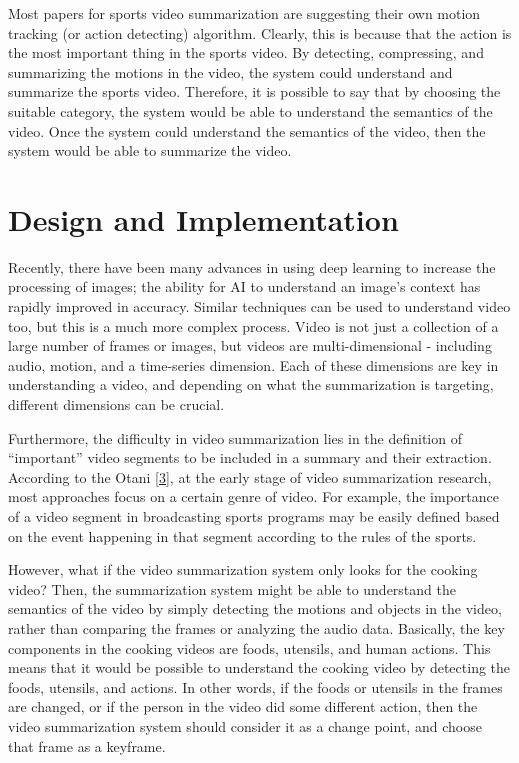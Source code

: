 \documentclass{article}
\begin{document}
Most papers for sports video summarization are suggesting their own motion tracking (or action detecting) algorithm. Clearly, this is because that the action is the most important thing in the sports video. By detecting, compressing, and summarizing the motions in the video, the system could understand and summarize the sports video. Therefore, it is possible to say that by choosing the suitable category, the system would be able to understand the semantics of the video. Once the system could understand the semantics of the video, then the system would be able to summarize the video.

\section{Design and Implementation}

Recently, there have been many advances in using deep learning to increase the processing of images; the ability for AI to understand an image’s context has rapidly improved in accuracy. Similar techniques can be used to understand video too, but this is a much more complex process. Video is not just a collection of a large number of frames or images, but videos are multi-dimensional - including audio, motion, and a time-series dimension. Each of these dimensions are key in understanding a video, and depending on what the summarization is targeting, different dimensions can be crucial.

Furthermore, the difficulty in video summarization lies in the definition of “important” video segments to be included in a summary and their extraction. According to the Otani \hyperlink{ref3}{[3]}, at the early stage of video summarization research, most approaches focus on a certain genre of video. For example, the importance of a video segment in broadcasting sports programs may be easily defined based on the event happening in that segment according to the rules of the sports.

However, what if the video summarization system only looks for the cooking video? Then, the summarization system might be able to understand the semantics of the video by simply detecting the motions and objects in the video, rather than comparing the frames or analyzing the audio data. Basically, the key components in the cooking videos are foods, utensils, and human actions. This means that it would be possible to understand the cooking video by detecting the foods, utensils, and actions. In other words, if the foods or utensils in the frames are changed, or if the person in the video did some different action, then the video summarization system should consider it as a change point, and choose that frame as a keyframe.
\end{document}
